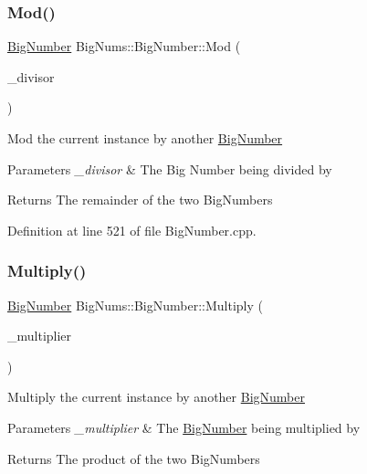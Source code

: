 \subsubsection{\texorpdfstring{Mod()}{Mod()}}
{\footnotesize\ttfamily \mbox{\hyperlink{class_big_nums_1_1_big_number}{Big\+Number}} Big\+Nums\+::\+Big\+Number\+::\+Mod (\begin{DoxyParamCaption}\item[{const \mbox{\hyperlink{class_big_nums_1_1_big_number}{Big\+Number}} \&}]{\+\_\+divisor }\end{DoxyParamCaption})}

Mod the current instance by another \mbox{\hyperlink{class_big_nums_1_1_big_number}{Big\+Number}} 
\begin{DoxyParams}{Parameters}
{\em \+\_\+divisor} & The Big Number being divided by \\
\hline
\end{DoxyParams}
\begin{DoxyReturn}{Returns}
The remainder of the two Big\+Numbers 
\end{DoxyReturn}


Definition at line 521 of file Big\+Number.\+cpp.

\mbox{\label{class_big_nums_1_1_big_number_a7d54b0defb30727ab99a110b1b6c07ff}} 
\subsubsection{\texorpdfstring{Multiply()}{Multiply()}}
{\footnotesize\ttfamily \mbox{\hyperlink{class_big_nums_1_1_big_number}{Big\+Number}} Big\+Nums\+::\+Big\+Number\+::\+Multiply (\begin{DoxyParamCaption}\item[{const \mbox{\hyperlink{class_big_nums_1_1_big_number}{Big\+Number}} \&}]{\+\_\+multiplier }\end{DoxyParamCaption})}

Multiply the current instance by another \mbox{\hyperlink{class_big_nums_1_1_big_number}{Big\+Number}} 
\begin{DoxyParams}{Parameters}
{\em \+\_\+multiplier} & The \mbox{\hyperlink{class_big_nums_1_1_big_number}{Big\+Number}} being multiplied by \\
\hline
\end{DoxyParams}
\begin{DoxyReturn}{Returns}
The product of the two Big\+Numbers 
\end{DoxyReturn}


